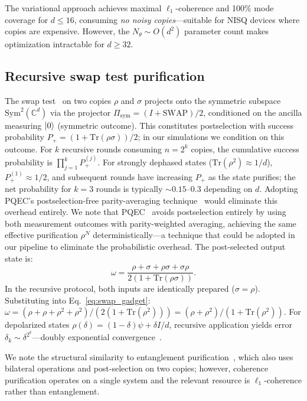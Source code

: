 \documentclass[a4paper,twocolumn]{quantumarticle}
\begin{document}
The variational approach achieves maximal $\ell_1$-coherence and 100\% mode coverage for $d \leq 16$, consuming \emph{no noisy copies}---suitable for NISQ devices where copies are expensive.
However, the $N_\theta \sim O(d^2)$ parameter count makes optimization intractable for $d \geq 32$.


\subsection{Recursive swap test purification}
\label{sec:swap_test}

The swap test~\cite{Childs2025,Barenco1997} on two copies $\rho$ and $\sigma$ projects onto the symmetric subspace $\mathrm{Sym}^2(\mathbb{C}^d)$ via the projector $\Pi_\mathrm{sym} = (I + \mathrm{SWAP})/2$, conditioned on the ancilla measuring $\ket{0}$ (symmetric outcome).
This constitutes postselection with success probability $P_+ = (1 + \mathrm{Tr}(\rho\sigma))/2$; in our simulations we condition on this outcome.
For $k$ recursive rounds consuming $n = 2^k$ copies, the cumulative success probability is $\prod_{j=1}^k P_+^{(j)}$.
For strongly dephased states ($\mathrm{Tr}(\rho^2) \approx 1/d$), $P_+^{(1)} \approx 1/2$, and subsequent rounds have increasing $P_+$ as the state purifies; the net probability for $k = 3$ rounds is typically $\sim\!0.15$--$0.3$ depending on $d$.
Adopting PQEC's postselection-free parity-averaging technique~\cite{Raghoonanan2026} would eliminate this overhead entirely.
We note that PQEC~\cite{Raghoonanan2026} avoids postselection entirely by using both measurement outcomes with parity-weighted averaging, achieving the same effective purification $\rho^N$ deterministically---a technique that could be adopted in our pipeline to eliminate the probabilistic overhead.
The post-selected output state is:
\begin{equation}
\omega = \frac{\rho + \sigma + \rho\sigma + \sigma\rho}{2(1 + \mathrm{Tr}(\rho\sigma))}.
\label{eq:swap_gadget}
\end{equation}
In the recursive protocol, both inputs are identically prepared ($\sigma = \rho$).
Substituting into Eq.~\eqref{eq:swap_gadget}: $\omega = (\rho + \rho + \rho^2 + \rho^2)/(2(1 + \mathrm{Tr}(\rho^2))) = (\rho + \rho^2)/(1 + \mathrm{Tr}(\rho^2))$.
For depolarized states $\rho(\delta) = (1-\delta)\psi + \delta I/d$, recursive application yields error $\delta_k \sim \delta^{2^k}$---doubly exponential convergence~\cite{Childs2025}.

We note the structural similarity to entanglement purification~\cite{Bennett1996}, which also uses bilateral operations and post-selection on two copies; however, coherence purification operates on a single system and the relevant resource is $\ell_1$-coherence rather than entanglement.
\end{document}
